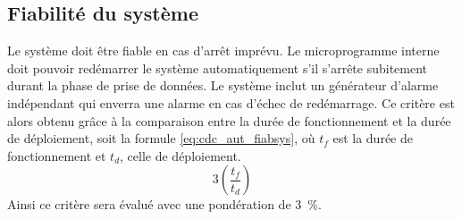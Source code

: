 

\subsection{Fiabilité du système}
\label{s:cdc_aut_fiabsys}

Le système doit être fiable en cas d’arrêt imprévu.
Le microprogramme interne doit pouvoir redémarrer le système automatiquement s’il s’arrête subitement durant la phase de prise de données.
Le système inclut un générateur d’alarme indépendant qui enverra une alarme en cas d’échec de redémarrage.
Ce critère est alors obtenu grâce à la comparaison entre la durée de fonctionnement et la durée de déploiement, soit la formule \ref{eq:cdc_aut_fiabsys}, où $t_f$ est la durée de fonctionnement et $t_d$, celle de déploiement.
\begin{equation} \label{eq:cdc_aut_fiabsys}
	3\left(\frac{t_f}{t_d}\right)
\end{equation}
Ainsi ce critère sera évalué avec une pondération de 3~\%.